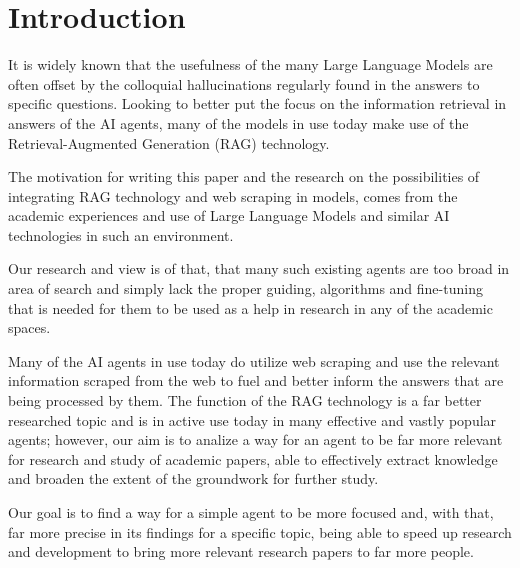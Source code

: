 \documentclass[fleqn,moreauthors,10pt]{ds_report}
\affiliation{\textit{Advisors: Aleš Žagar}}
\begin{document}
\flushbottom 

\maketitle 

\thispagestyle{empty} 


\section*{Introduction}

It is widely known that the usefulness of the many Large Language Models are often offset by the colloquial hallucinations regularly found in the answers to specific questions. Looking to better put the focus on the information retrieval in answers of the AI agents, many of the models in use today make use of the Retrieval-Augmented Generation (RAG) technology.

The motivation for writing this paper and the research on the possibilities of integrating RAG technology and web scraping in models, comes from the academic experiences and use of Large Language Models and similar AI technologies in such an environment. 

Our research and view is of that, that many such existing agents are too broad in area of search and simply lack the proper guiding, algorithms and fine-tuning that is needed for them to be used as a help in research in any of the academic spaces. 

Many of the AI agents in use today do utilize web scraping and use the relevant information scraped from the web to fuel and better inform the answers that are being processed by them. The function of the RAG technology is a far better researched topic and is in active use today in many effective and vastly popular agents; however, our aim is to analize a way for an agent to be far more relevant for research and study of academic papers, able to effectively extract knowledge and broaden the extent of the groundwork for further study.

Our goal is to find a way for a simple agent to be more focused and, with that, far more precise in its findings for a specific topic, being able to speed up research and development to bring more relevant research papers to far more people.
\end{document}
